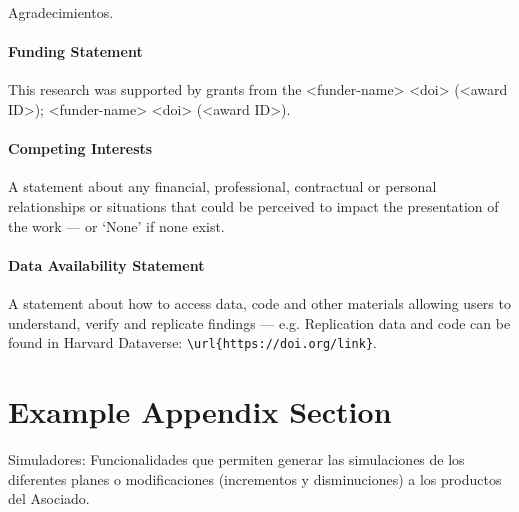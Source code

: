 \documentclass[
  journal=large,
  manuscript=propuesta,
  year=2020,
  volume=37,
]{cup-journal}
\begin{document}
\begin{acknowledgement}
Agradecimientos.
\end{acknowledgement}

\paragraph{Funding Statement}

This research was supported by grants from the <funder-name> <doi> (<award ID>); <funder-name> <doi> (<award ID>).

\paragraph{Competing Interests}

A statement about any financial, professional, contractual or personal relationships or situations that could be perceived to impact the presentation of the work --- or `None' if none exist.

\paragraph{Data Availability Statement}

A statement about how to access data, code and other materials allowing users to understand, verify and replicate findings --- e.g. Replication data and code can be found in Harvard Dataverse: \verb+\url{https://doi.org/link}+.



\printendnotes


\appendix

\section{Example Appendix Section}

Simuladores: Funcionalidades que permiten generar las simulaciones de
los diferentes planes o modificaciones (incrementos y disminuciones) a
los productos del Asociado.
\end{document}
